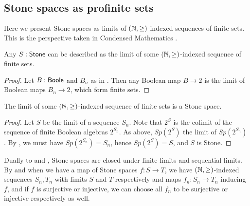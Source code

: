 
\subsection{Stone spaces as profinite sets}
Here we present Stone spaces as limits of $(\mathbb{N},\geq)$-indexed sequences of finite sets. 
This is the perspective taken in Condensed Mathematics \cite{Condensed,Dagur,Scholze}.
\begin{lemma}
  Any $S:\mathsf{Stone}$ can be described as the limit of some $(\mathbb{N},\geq)$-indexed sequence of 
  finite sets. 
\end{lemma}
\begin{proof}
  Let $B:\mathsf{Boole}$ and $B_n$ as in . 
  Then any Boolean map $B\to 2$ is the limit of Boolean maps $B_n \to 2$, 
  which form finite sets.
\end{proof}
\begin{lemma}
  The limit of some $(\mathbb{N},\geq)$-indexed sequence of finite sets is a Stone space. 
\end{lemma}
\begin{proof}
  Let $S$ be the limit of a sequence $S_n$. 
  Note that $2^S$ is the colimit of the sequence of finite Boolean algebras $2^{S_n}$.
  As above, $Sp(2^S)$ the limit of $Sp(2^{S_n})$.
  By , we must have $Sp(2^{S_n}) = S_n$, hence $Sp(2^S) = S$, 
  and $S$ is Stone. 
\end{proof}


\begin{remark}\label{StoneClosedUnderPullback}
  Dually to  and , 
  Stone spaces are closed under finite limits and sequential limits.
  By  and 
   when we have a map of Stone spaces $f:S\to T$, 
  we have $(\mathbb{N},\geq)$-indexed sequences $S_n,T_n$ with limits $S$ and $T$ respectively
  and maps $f_n:S_n\to T_n$ inducing $f$, and if $f$ is surjective or injective, we 
  can choose all $f_n$ to be surjective or injective respectively as well. 
\end{remark}



